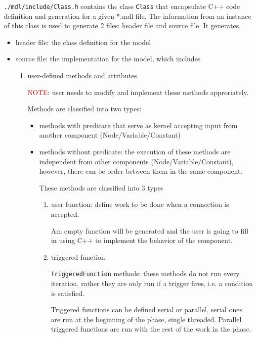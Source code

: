 \verb!./mdl/include/Class.h! contains the class \verb!Class! that encapsulate
C++ code definition and generation for a given *.mdl file. The information from
an instance of this class is used to generate 2 files:
header file and source file. It generates,
\begin{itemize}
  \item header file: the class definition for the model
  
  
  \item source file: the implementation for the model, which includes
  \begin{enumerate}
    \item user-defined methods and attributes
    
 \textcolor{red}{NOTE}: user needs to modify and implement these methods
 approriately. 
 
 Methods are classified into two types:
 \begin{itemize}
   \item methods with predicate that serve as kernel accepting input from
   another component (Node/Variable/Constant)
   
   \item methods without predicate: the execution of these methods
   are independent from other components (Node/Variable/Constant), however,
   there can be order between them in the same component.
   
   
   These methods are classified into 3 types
   \begin{enumerate}
     \item user function:
     define work to be done when a connection is accepted.
     
     Am empty function will be generated and the user is going to fill
     in using C++ to implement the behavior of the component. 
     
     \item triggered function
     
     \verb!TriggeredFunction! methods:
     these methods do not run every iteration, rather they are only run if a
     trigger fires, i.e. a condition is satisfied.
     
     Triggered functions can be defined serial or parallel, serial ones are run
     at the beginning of the phase, single threaded.  Parallel triggered
     functions are run with the rest of the work in the phase.
     

\end{enumerate}
\end{itemize}
\end{enumerate}
\end{itemize}
